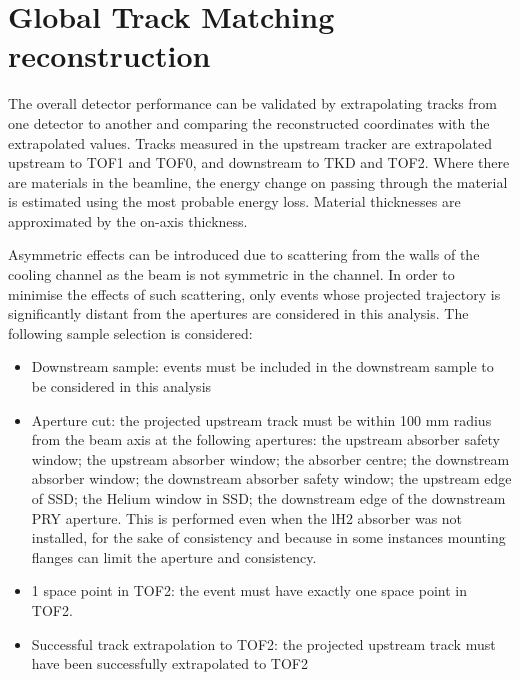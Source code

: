 \graphicspath{{08-Track-matching/Figures/}}

\section{Global Track Matching reconstruction}
\label{Sect:TM}


\newcommand{\topmatterallplots}[4]{%
    \hspace*{-2.0cm}\texttt{[image: \#1/Figures/\#2/\#3.png]}
    \caption{#4 \label{fig:#3}}
    }

The overall detector performance can be validated by extrapolating tracks from
one detector to another and comparing the reconstructed coordinates with the 
extrapolated values.
Tracks measured in the upstream tracker are extrapolated upstream to TOF1 and TOF0, and downstream
to TKD and TOF2. Where there are materials in the beamline, the energy change on
passing through the material is estimated using the most probable energy loss. 
Material thicknesses are approximated by the on-axis thickness. 

Asymmetric effects can be introduced due to scattering from the walls of the
cooling channel as the beam is not symmetric in the channel. In order to 
minimise the effects of such scattering, only events whose projected 
trajectory is  significantly distant from the apertures are considered in this 
analysis. The following sample selection is considered:

\begin{itemize}
\item{Downstream sample:} events must be included in the downstream sample to
be considered in this analysis
\item{Aperture cut:} the projected upstream track must be within 100 mm radius 
from the beam axis at the following apertures: the upstream absorber safety window;
the upstream absorber window; the absorber centre; the downstream absorber window;
the downstream absorber safety window; the upstream edge of SSD; the Helium window
in SSD; the downstream edge of the downstream PRY aperture. This is performed
even when the lH2 absorber was not installed, for the sake of consistency and
because in some instances mounting flanges can limit the aperture and consistency.
\item{1 space point in TOF2:} the event must have exactly one space point in TOF2.
\item{Successful track extrapolation to TOF2:} the projected upstream track must
have been successfully extrapolated to TOF2
\end{itemize}

